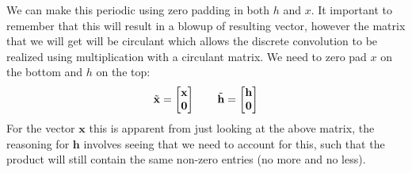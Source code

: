 \documentclass{article}
\begin{document}
We can make this periodic using zero padding in both $h$ and $x$. It important to remember that this will result in a blowup of resulting vector, however the matrix that we will get will be circulant which allows the discrete convolution to be realized using multiplication with a circulant matrix. We need to zero pad $x$ on the bottom and $h$ on the top:
\begin{equation*}
    \Tilde{\mathbf{x}} = \begin{bmatrix}
    \mathbf{x} \\
    \mathbf{0}
    \end{bmatrix} \qquad \Tilde{\mathbf{h}} = \begin{bmatrix}
    \mathbf{h} \\
    \mathbf{0}
    \end{bmatrix}
\end{equation*}
For the vector $\mathbf{x}$ this is apparent from just looking at the above matrix, the reasoning for $\mathbf{h}$ involves seeing that we need to account for this, such that the product will still contain the same non-zero entries (no more and no less).
\pagebreak
\end{document}
